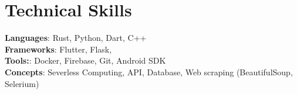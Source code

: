 \section{Technical Skills}
    \begin{itemize}[leftmargin=0.15in, label={}]
	\small{\item{
		\textbf{Languages}{: Rust, Python, Dart, C++} \\
		\textbf{Frameworks}{: Flutter, Flask,} \\
        \textbf{Tools:}{: Docker, Firebase, Git, Android SDK} \\
		\textbf{Concepts}{: Severless Computing, API, Database, Web scraping (BeautifulSoup, Selerium)}
	}}
    \end{itemize}